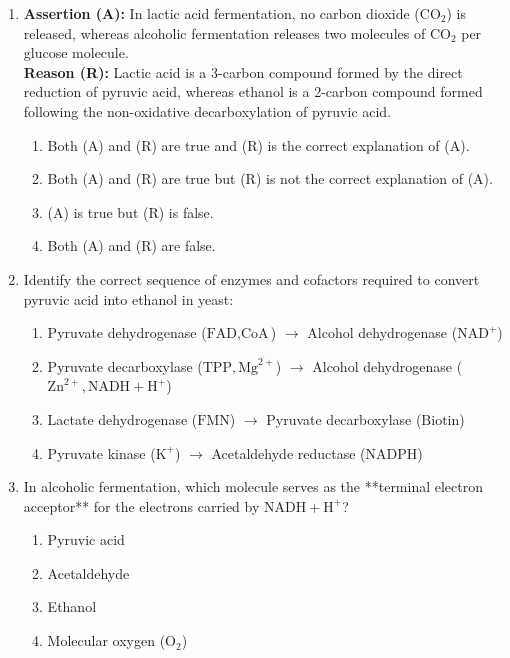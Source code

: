 \documentclass[11pt, a4paper]{article}
\begin{document}
\begin{enumerate}[label=\textbf{\arabic*.}]
\item \textbf{Assertion (A):} In lactic acid fermentation, no carbon dioxide ($\text{CO}_2$) is released, whereas alcoholic fermentation releases two molecules of $\text{CO}_2$ per glucose molecule. \\
\textbf{Reason (R):} Lactic acid is a 3-carbon compound formed by the direct reduction of pyruvic acid, whereas ethanol is a 2-carbon compound formed following the non-oxidative decarboxylation of pyruvic acid.
\begin{enumerate}[label=(\Alph*)]
    \item Both (A) and (R) are true and (R) is the correct explanation of (A).
    \item Both (A) and (R) are true but (R) is not the correct explanation of (A).
    \item (A) is true but (R) is false.
    \item Both (A) and (R) are false.
\end{enumerate}

\item Identify the correct sequence of enzymes and cofactors required to convert pyruvic acid into ethanol in yeast:
\begin{enumerate}[label=(\Alph*)]
    \item Pyruvate dehydrogenase ($\text{FAD}, \text{CoA}$) $\rightarrow$ Alcohol dehydrogenase ($\text{NAD}^+$)
    \item Pyruvate decarboxylase ($\text{TPP}, \text{Mg}^{2+}$) $\rightarrow$ Alcohol dehydrogenase ($\text{Zn}^{2+}, \text{NADH} + \text{H}^+$)
    \item Lactate dehydrogenase ($\text{FMN}$) $\rightarrow$ Pyruvate decarboxylase ($\text{Biotin}$)
    \item Pyruvate kinase ($\text{K}^+$) $\rightarrow$ Acetaldehyde reductase ($\text{NADPH}$)
\end{enumerate}

\item In alcoholic fermentation, which molecule serves as the **terminal electron acceptor** for the electrons carried by $\text{NADH} + \text{H}^+$?
\begin{enumerate}[label=(\Alph*)]
    \item Pyruvic acid
    \item Acetaldehyde
    \item Ethanol
    \item Molecular oxygen ($\text{O}_2$)
\end{enumerate}


\end{enumerate}
\end{document}

